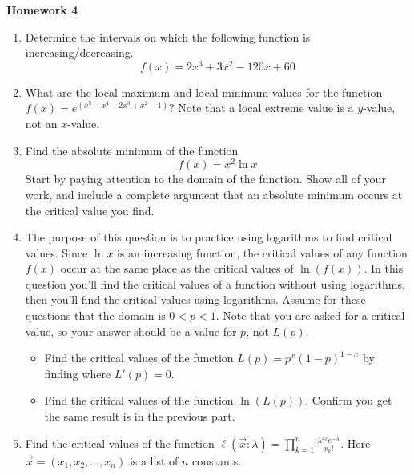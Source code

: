 \documentclass{article}
\begin{document}
 \begin{center}
    \large \textbf{Homework 4}
\end{center}
            \begin{enumerate}
                 \item Determine the intervals on which the following function is increasing/decreasing.  $$f(x)=2x^3+3x^2-120x+60$$
                 \item What are the local maximum and local minimum values for the function $f(x) = e^{(x^5-x^4-2x^3+x^2-1)}$? Note that a local extreme value is a $y$-value, not an $x$-value.
                \item Find the absolute minimum of the function 
                $$f(x) = x^2\ln{x}$$
                Start by paying attention to the domain of the function. Show all of your work, and include a complete argument that an absolute minimum occurs at the critical value you find.
                \item The purpose of this question is to practice using logarithms to find critical values. Since $\ln{x}$ is an increasing function, the critical values of any function $f(x)$ occur at the same place as the critical values of $\ln{(f(x))}$. In this question you'll find the critical values of a function without using logarithms, then you'll find the critical values using logarithms. Assume for these questions that the domain is $0 < p < 1$. Note that you are asked for a critical value, so your answer should be a value for $p$, not $L(p)$.
                \begin{itemize}
                    \item Find the critical values of the function $L(p) = p^x(1-p)^{1-x}$ by finding where $L'(p) = 0$.
                    \item Find the critical values of the function $\ln{(L(p))}$. Confirm you get the same result is in the previous part.
                \end{itemize} 
                \item Find the critical values of the function $ \ell(\vec{x}:\lambda) = \prod_{k=1}^{n} \frac{\lambda^{x_k}e^{-\lambda}}{x_k!}$. Here $\vec{x}=(x_1,x_2,\dots,x_n)$ is a list of $n$ constants.
                
 





\end{enumerate}
\end{document}
